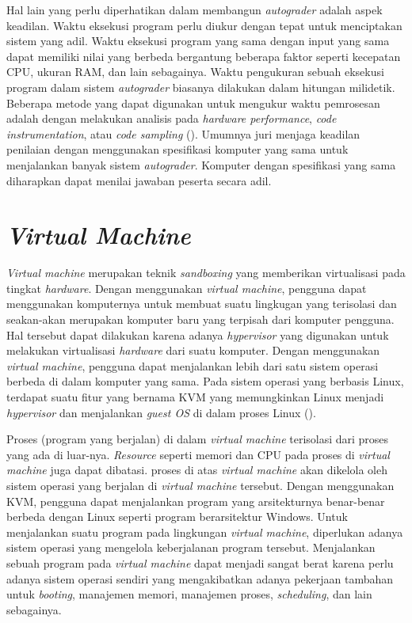 \par Hal lain yang perlu diperhatikan dalam membangun \textit{autograder} adalah aspek keadilan. Waktu eksekusi program perlu diukur dengan tepat untuk menciptakan sistem yang adil. Waktu eksekusi program yang sama dengan input yang sama dapat memiliki nilai yang berbeda bergantung beberapa faktor seperti kecepatan CPU, ukuran RAM, dan lain sebagainya. Waktu pengukuran sebuah eksekusi program dalam sistem \textit{autograder} biasanya dilakukan dalam hitungan milidetik. Beberapa metode yang dapat digunakan untuk mengukur waktu pemrosesan adalah dengan melakukan analisis pada \textit{hardware performance}, \textit{code instrumentation}, atau \textit{code sampling} (\cite{wasikojsurvey}). Umumnya juri menjaga keadilan penilaian dengan menggunakan spesifikasi komputer yang sama untuk menjalankan banyak sistem \textit{autograder}. Komputer dengan spesifikasi yang sama diharapkan dapat menilai jawaban peserta secara adil.

\section{\textit{Virtual Machine}}

\par \textit{Virtual machine} merupakan teknik \textit{sandboxing} yang memberikan virtualisasi pada tingkat \textit{hardware}. Dengan menggunakan \textit{virtual machine}, pengguna dapat menggunakan komputernya untuk membuat suatu lingkugan yang terisolasi dan seakan-akan merupakan komputer baru yang terpisah dari komputer pengguna. Hal tersebut dapat dilakukan karena adanya \textit{hypervisor} yang digunakan untuk melakukan virtualisasi \textit{hardware} dari suatu komputer. Dengan menggunakan \textit{virtual machine}, pengguna dapat menjalankan lebih dari satu sistem operasi berbeda di dalam komputer yang sama. Pada sistem operasi yang berbasis Linux, terdapat suatu fitur yang bernama KVM yang memungkinkan Linux menjadi \textit{hypervisor} dan menjalankan \textit{guest OS} di dalam proses Linux (\cite{wfeltervmcontainer}).

\par Proses (program yang berjalan) di dalam \textit{virtual machine} terisolasi dari proses yang ada di luar-nya. \textit{Resource} seperti memori dan CPU pada proses di \textit{virtual machine} juga dapat dibatasi. proses di atas \textit{virtual machine} akan dikelola oleh sistem operasi yang berjalan di \textit{virtual machine} tersebut. Dengan menggunakan KVM, pengguna dapat menjalankan program yang arsitekturnya benar-benar berbeda dengan Linux seperti program berarsitektur Windows. Untuk menjalankan suatu program pada lingkungan \textit{virtual machine}, diperlukan adanya sistem operasi yang mengelola keberjalanan program tersebut. Menjalankan sebuah program pada \textit{virtual machine} dapat menjadi sangat berat karena perlu adanya sistem operasi sendiri yang mengakibatkan adanya pekerjaan tambahan untuk \textit{booting}, manajemen memori, manajemen proses, \textit{scheduling}, dan lain sebagainya.

